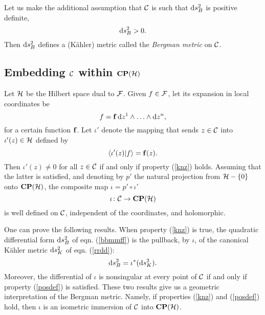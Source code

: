 \documentclass[a4paper,a4paper]{article}
\begin{document}
Let us make the additional assumption that ${\cal C}$ is such that ${\rm d}s^2_B$ 
is positive definite,
\begin{equation}
{\rm d}s^2_B>0.
\label{posdef}
\end{equation}
Then ${\rm d}s^2_B$ defines a (K\"ahler) metric  called the {\it Bergman metric} 
on ${\cal C}$.


\subsection{Embedding ${\cal C}$ within ${\bf CP}({\cal H})$}\label{fedemb}


Let ${\cal H}$ be the Hilbert space dual to ${\cal F}$. Given $f\in {\cal F}$, let its expansion 
in local coordinates be
\begin{equation}
f={\bf f}\,{\rm d}z^1\wedge\ldots\wedge{\rm d}z^n,
\label{ppxx}
\end{equation}
for a certain function ${\bf f}$. Let $\iota'$ denote the mapping that sends $z\in {\cal C}$ 
into $\iota'(z)\in{\cal H}$ defined by
\begin{equation}
\langle\iota'(z)|f\rangle = {\bf f}(z).
\label{hhaa}
\end{equation}
Then $\iota'(z)\neq 0$ for all $z\in{\cal C}$ if and only if property (\ref{knz}) holds. 
Assuming that the latter is satisfied, and denoting by $p'$ the natural projection from 
${\cal H}-\{0\}$ onto ${\bf CP}({\cal H})$, the composite map $\iota = p'\circ\iota'$ 
\begin{equation}
\iota\colon{\cal C}\rightarrow{\bf CP}({\cal H})
\label{ccmmppp}
\end{equation}
is well defined on ${\cal C}$, independent of the coordinates, and holomorphic. 

One can prove the following results. When property (\ref{knz}) is true, the 
quadratic differential form ${\rm d}s^2_B$ of eqn. (\ref{bbmmff}) is the pullback, 
by $\iota$, of the canonical K\"ahler metric ${\rm d}s^2_K$ of eqn. (\ref{rrdd}):
\begin{equation}
{\rm d}s^2_B = \iota^*({\rm d}s^2_K).
\label{ppbbck}
\end{equation}
Moreover, the differential of $\iota$ is nonsingular at every point 
of ${\cal C}$ if and only if property (\ref{posdef}) is satisfied. 
These two results give us a geometric interpretation of the Bergman metric. 
Namely, if properties (\ref{knz}) and (\ref{posdef}) hold, 
then $\iota$ is an isometric immersion of ${\cal C}$ into ${\bf CP}({\cal H})$.
\end{document}
